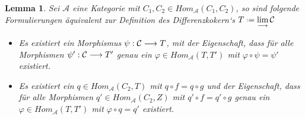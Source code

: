 \documentclass[10pt,a4paper]{report}
\newcounter{Aussage}[chapter]
\newtheorem{lemma}[Aussage]{Lemma}
\newcommand{\functionfront}[3]{\nolinebreak{#1:#2 \longrightarrow #3}}
\newcommand{\colimes}[0]{\lim\limits_{ \longrightarrow }}
\newcommand*{\defeq}{\mathrel{\vcenter{\baselineskip0.5ex \lineskiplimit0pt
                     \hbox{\scriptsize.}\hbox{\scriptsize.}}}%
                     =}
\begin{document}
\begin{lemma}\label{NeuDifferenzenkokerndef} Sei $\mathcal{A}$ eine Kategorie mit $C_1,C_2 \in Hom_{\mathcal{A}}(C_1,C_2)$, so sind folgende Formulierungen äquivalent zur Definition des Differenzkokern`s $T \defeq \colimes \mathcal{C}$
\begin{itemize}
\item[1.] Es existiert ein Morphismus $\functionfront{\psi}{\mathcal{C}}{T}$, mit der Eigenschaft, dass für alle Morphismen $\functionfront{\psi '}{\mathcal{C}}{T'}$ genau ein $\varphi \in Hom_{\mathcal{A}}(T,T')$ mit $\varphi \circ \psi = \psi '$ existiert.
\item[2.] Es existiert ein $q \in Hom_{\mathcal{A}}(C_2,T)$ mit $q \circ f = q \circ g$ und der Eigenschaft, dass für alle Morphismen $q' \in Hom_{\mathcal{A}}(C_2,Z)$ mit $q' \circ f = q' \circ g$ genau ein $\varphi \in Hom_{\mathcal{A}}(T,T')$ mit $\varphi \circ q = q'$ existiert.
\begin{center}
\end{center}
\end{itemize}
\end{lemma}
\end{document}
